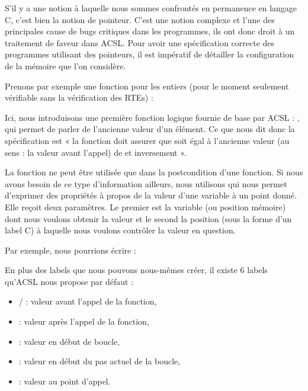 S'il y a une notion à laquelle nous sommes confrontés en permanence en
langage C, c'est bien la notion de pointeur. C'est une notion complexe et
l'une des principales cause de bugs critiques dans les programmes, ils ont
donc droit à un traitement de faveur dans ACSL. Pour avoir une spécification
correcte des programmes utilisant des pointeurs, il est impératif de détailler
la configuration de la mémoire que l'on considère.



Prenons par exemple une fonction  pour les entiers (pour
le moment seulement vérifiable sans la vérification des RTEs) :








Ici, nous introduisons une première fonction logique fournie de base par
ACSL : , qui permet de parler de l'ancienne
valeur d'un élément. Ce que nous dit donc la spécification est « la fonction
doit assurer que  soit égal à l'ancienne valeur (au sens : la
valeur avant l'appel) de  et inversement ».



La fonction  ne peut être utilisée que dans la
postcondition d'une fonction. Si nous avons besoin de ce type d'information
ailleurs, nous utilisons  qui nous permet
d'exprimer des propriétés à propos de la
valeur d'une variable à un point donné. Elle reçoit deux paramètres. Le premier
est la variable (ou position mémoire) dont nous voulons obtenir la valeur et le
second la position (sous la forme d'un label C) à laquelle nous voulons
contrôler la valeur en question.



Par exemple, nous pourrions écrire :






En plus des labels que nous pouvons nous-mêmes créer, il existe 6 labels
qu'ACSL nous propose par défaut :



\begin{itemize}
\item {}/ : valeur avant l'appel de la fonction,
\item {} : valeur après l'appel de la fonction,
\item {} : valeur en début de boucle,
\item {} : valeur en début du pas actuel de la boucle,
\item {} : valeur au point d'appel.
\end{itemize}


